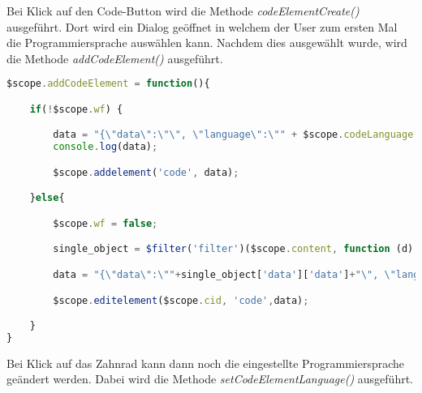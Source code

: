 
Bei Klick auf den Code-Button wird die Methode \textit{codeElementCreate()} ausgeführt. Dort wird ein Dialog geöffnet in welchem der User zum ersten Mal die Programmiersprache auswählen kann. Nachdem dies ausgewählt wurde, wird die Methode \textit{addCodeElement()} ausgeführt.

\begin{lstlisting}[caption={Code-Element Persistierung}, language=Javascript]
$scope.addCodeElement = function(){

    if(!$scope.wf) {

        data = "{\"data\":\"\", \"language\":\"" + $scope.codeLanguage + "\"}";
        console.log(data);

        $scope.addelement('code', data);

    }else{

        $scope.wf = false;

        single_object = $filter('filter')($scope.content, function (d) {return d.id === $scope.cid;})[0];

        data = "{\"data\":\""+single_object['data']['data']+"\", \"language\":\"" + $scope.codeLanguage + "\"}";

        $scope.editelement($scope.cid, 'code',data);

    }
}
\end{lstlisting}

Bei Klick auf das Zahnrad kann dann noch die eingestellte Programmiersprache geändert werden. Dabei wird die Methode \textit{setCodeElementLanguage()} ausgeführt.
